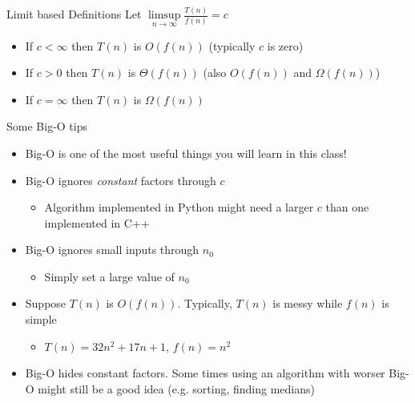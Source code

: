 \documentclass{beamer}
\begin{document}
\begin{frame}{Limit based Definitions}
Let $\limsup\limits_{n \rightarrow \infty} \frac{T(n)}{f(n)} = c$
\begin{itemize}
\item If $c < \infty$ then $T(n)$ is $O(f(n))$  (typically $c$ is zero)
\item If $c > 0$ then $T(n)$ is $\Theta(f(n))$  (also $O(f(n))$ and $\Omega(f(n))$)
\item If $c = \infty$ then $T(n)$ is $\Omega(f(n))$ 
\end{itemize}
\end{frame}

\begin{frame}{Some Big-O tips}
\begin{itemize}
\item Big-O is one of the most useful things you will learn in this class!
\item Big-O ignores {\em constant} factors through $c$ 
\begin{itemize}
\item Algorithm implemented in Python might need a larger $c$ than one implemented in C++
\end{itemize}
\item Big-O ignores small inputs through $n_0$ 
\begin{itemize}
\item Simply set a large value of $n_0$
\end{itemize}
\item Suppose $T(n)$ is $O(f(n))$. Typically, $T(n)$ is messy while $f(n)$ is simple 
\begin{itemize}
\item $T(n)=32n^2+17n+1$, $f(n)=n^2$
\end{itemize}
\item Big-O hides constant factors. Some times using an algorithm with worser Big-O might still be a good idea 
(e.g. sorting, finding medians)
\end{itemize}
\end{frame}
\end{document}
